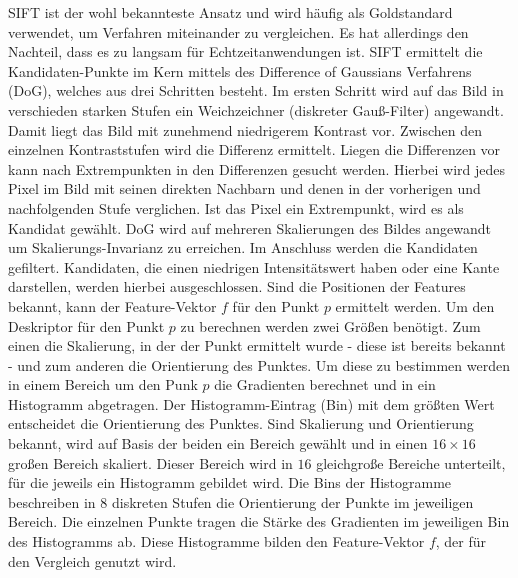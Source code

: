 \documentclass[12pt,titlepage, twoside]{article}
\begin{document}
SIFT \cite{Sift} ist der wohl bekannteste Ansatz und wird häufig als Goldstandard verwendet, um Verfahren miteinander zu vergleichen. Es hat allerdings den Nachteil, dass es zu langsam für Echtzeitanwendungen ist.
SIFT ermittelt die Kandidaten-Punkte im Kern mittels des Difference of Gaussians Verfahrens (DoG), welches aus drei Schritten besteht. Im ersten Schritt wird auf das Bild in verschieden starken Stufen ein Weichzeichner (diskreter Gauß-Filter) angewandt.
Damit liegt das Bild mit zunehmend niedrigerem Kontrast vor. Zwischen den einzelnen Kontraststufen wird die Differenz ermittelt. Liegen die Differenzen vor kann nach Extrempunkten in den Differenzen gesucht werden.
Hierbei wird jedes Pixel im Bild mit seinen direkten Nachbarn und denen in der vorherigen und nachfolgenden Stufe verglichen. Ist das Pixel ein Extrempunkt, wird es als Kandidat gewählt.
DoG wird auf mehreren Skalierungen des Bildes angewandt um Skalierungs-Invarianz zu erreichen.
Im Anschluss werden die Kandidaten gefiltert. Kandidaten, die einen niedrigen Intensitätswert haben oder eine Kante darstellen, werden hierbei ausgeschlossen.
Sind die Positionen der Features bekannt, kann der Feature-Vektor $f$ für den Punkt $p$ ermittelt werden. 
Um den Deskriptor für den Punkt $p$ zu berechnen werden zwei Größen benötigt. Zum einen die Skalierung, in der der Punkt ermittelt wurde - diese ist bereits bekannt - und zum anderen die Orientierung des Punktes.
Um diese zu bestimmen werden in einem Bereich um den Punk $p$ die Gradienten berechnet und in ein Histogramm abgetragen. Der Histogramm-Eintrag (Bin) mit dem größten Wert entscheidet die Orientierung des Punktes.
Sind Skalierung und Orientierung bekannt, wird auf Basis der beiden ein Bereich gewählt und in einen $16\times 16$ großen Bereich skaliert. 
Dieser Bereich wird in $16$ gleichgroße Bereiche unterteilt, für die jeweils ein Histogramm gebildet wird. 
Die Bins der Histogramme beschreiben in $8$ diskreten Stufen die Orientierung der Punkte im jeweiligen Bereich. 
Die einzelnen Punkte tragen die Stärke des Gradienten im jeweiligen Bin des Histogramms ab.
Diese Histogramme bilden den Feature-Vektor $f$, der für den Vergleich genutzt wird.
\end{document}
